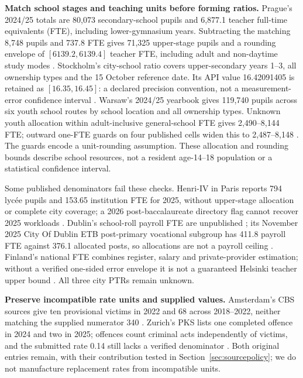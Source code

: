 \textbf{Match school stages and teaching units before forming ratios.}
Prague's 2024/25 totals are 80,073 secondary-school pupils and 6,877.1
teacher full-time equivalents (FTE), including lower-gymnasium years. Subtracting the matching
8,748 pupils and 737.8 FTE gives 71,325 upper-stage pupils and
a rounding envelope of $[6139.2,6139.4]$ teacher FTE, including adult and non-daytime study modes
\cite{prague}. Stockholm's city-school ratio covers upper-secondary years 1--3, all ownership
types and the 15 October reference date. Its API value 16.42091405 is retained
as $[16.35,16.45]$: a declared precision convention, not a measurement-error
confidence interval \cite{kolada}.
Warsaw's 2024/25 yearbook gives 119,740 pupils across six youth school routes
by school location and all ownership types. Unknown youth allocation within
adult-inclusive general-school FTE gives 2,490--8,144 FTE; outward one-FTE
guards on four published cells widen this to 2,487--8,148 \cite{warsawedu2025}.
The guards encode a unit-rounding assumption. These allocation and rounding
bounds describe school resources, not a resident age-14--18 population or a
statistical confidence interval.

Some published denominators fail these checks. Henri-IV in Paris reports
794 lyc\'ee pupils and 153.65 institution FTE for 2025, without upper-stage
allocation or complete city coverage; a 2026 post-baccalaureate directory flag cannot recover
2025 workloads \cite{deppmatch,deppdirectory}. Dublin's school-roll payroll
FTE are unpublished \cite{irelandfte}; its November 2025 City Of Dublin ETB
post-primary vocational subgroup has 411.8 payroll FTE against 376.1 allocated posts, so
allocations are not a payroll ceiling \cite{irelandpayroll}.
Finland's national FTE combines register, salary and private-provider estimation;
without a verified one-sided error envelope it is not a guaranteed Helsinki
teacher upper bound \cite{finlandfte}. All three city PTRs remain unknown.

\textbf{Preserve incompatible rate units and supplied values.}
Amsterdam's CBS sources give ten provisional victims in 2022 and 68 across
2018--2022, neither matching the supplied numerator 340 \cite{cbshomicide2022}.
Zurich's PKS lists one completed offence in 2024 and two in 2025; offences
count criminal acts independently of victims, and the submitted rate 0.14
still lacks a verified denominator \cite{zhpks2025}. Both original entries
remain, with their contribution tested in Section~\ref{sec:sourcepolicy};
we do not manufacture replacement rates from incompatible units.

